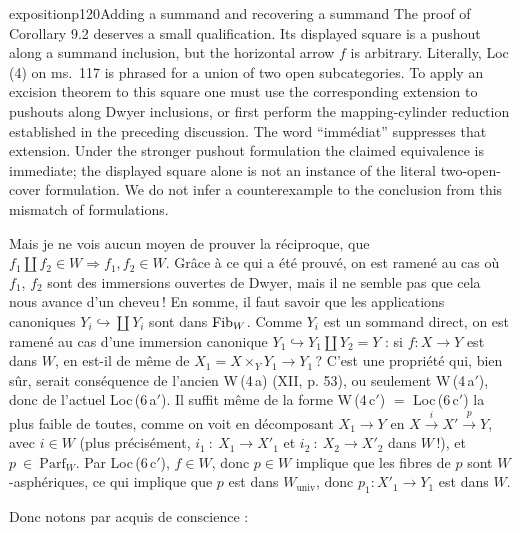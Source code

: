 \begin{dcomment}{exposition}{p120}{Adding a summand and recovering a summand}
The proof of Corollary 9.2 deserves a small qualification. Its displayed square is a pushout along a summand inclusion, but the horizontal arrow $f$ is arbitrary. Literally, Loc\,(4) on ms.~117 is phrased for a union of two open subcategories. To apply an excision theorem to this square one must use the corresponding extension to pushouts along Dwyer inclusions, or first perform the mapping-cylinder reduction established in the preceding discussion. The word ``immédiat'' suppresses that extension. Under the stronger pushout formulation the claimed equivalence is immediate; the displayed square alone is not an instance of the literal two-open-cover formulation. We do not infer a counterexample to the conclusion from this mismatch of formulations.
\end{dcomment}


Mais je ne vois aucun moyen de prouver la réciproque, que $f_1\amalg f_2\in W\Longrightarrow f_1,f_2\in W$. Grâce à ce qui a été prouvé, on est ramené au cas où $f_1$, $f_2$ sont des immersions ouvertes de Dwyer, mais il ne semble pas que cela nous avance d'un cheveu\,! En somme, il faut savoir que les applications canoniques $Y_i\hookrightarrow\coprod Y_i$ sont dans $\mathrm{Fib}_W$. Comme $Y_i$ est un sommand direct, on est ramené au cas d'une immersion canonique $Y_1\hookrightarrow Y_1\amalg Y_2=Y$ : si $f : X\longrightarrow Y$ est dans $W$, en est-il de même de $X_1=X\times_Y Y_1\longrightarrow Y_1$\,? C'est une propriété qui, bien sûr, serait conséquence de l'ancien W\,(4\,a) (XII, p. 53), ou seulement W\,(4\,a$'$), donc de l'actuel Loc\,(6\,a$'$). Il suffit même de la forme W\,(4\,c$'$) $=$ Loc\,(6\,c$'$) la plus faible de toutes, comme on voit en décomposant $X_1\longrightarrow Y$ en $X\xrightarrow{\ i\ }X'\xrightarrow{\ p\ }Y$, avec $i\in W$ (plus précisément, $i_1\ :\ X_1\longrightarrow X'_1$ et $i_2\ :\ X_2\longrightarrow X'_2$ dans $W$\,!), et $p\ \in\ \mathrm{Parf}_W$. Par Loc\,(6\,c$'$), $f\in W$, donc $p\in W$ implique que les fibres de $p$ sont $W$-asphériques, ce qui implique que $p$ est dans $W_{\mathrm{univ}}$, donc $p_1 : X'_1\longrightarrow Y_1$ est dans $W$.


Donc notons par acquis de conscience :

